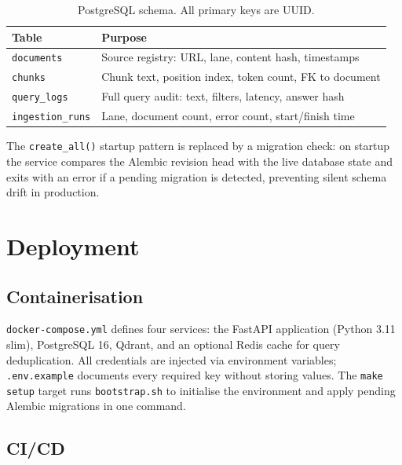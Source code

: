\documentclass[10pt,a4paper,twocolumn]{article}
\begin{document}
\begin{table}[H]
\centering
\caption{PostgreSQL schema. All primary keys are UUID.}
\label{tab:db}
\scriptsize
\begin{tabularx}{\columnwidth}{lX}
\toprule
\textbf{Table} & \textbf{Purpose} \\
\midrule
\texttt{documents}       & Source registry: URL, lane, content hash, timestamps \\
\texttt{chunks}          & Chunk text, position index, token count, FK to document \\
\texttt{query\_logs}     & Full query audit: text, filters, latency, answer hash \\
\texttt{ingestion\_runs} & Lane, document count, error count, start/finish time \\
\bottomrule
\end{tabularx}
\end{table}

The \texttt{create\_all()} startup pattern is replaced by a migration check: on startup the
service compares the Alembic revision head with the live database state and exits with an
error if a pending migration is detected, preventing silent schema drift in production.

\section{Deployment}

\subsection{Containerisation}

\texttt{docker-compose.yml} defines four services: the FastAPI application (Python 3.11 slim),
PostgreSQL 16, Qdrant, and an optional Redis cache for query deduplication. All credentials
are injected via environment variables; \texttt{.env.example} documents every required key
without storing values. The \texttt{make setup} target runs \texttt{bootstrap.sh} to
initialise the environment and apply pending Alembic migrations in one command.

\subsection{CI/CD}
\end{document}
